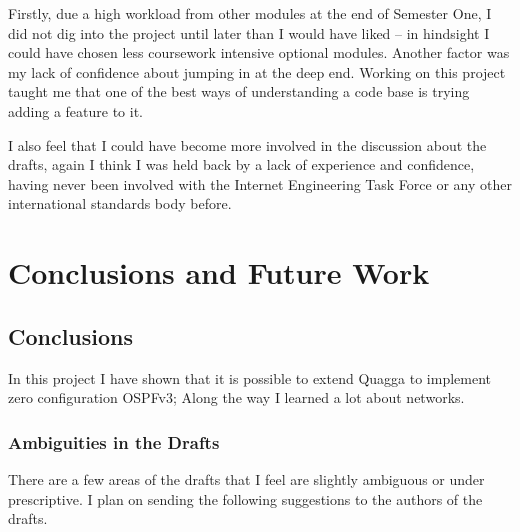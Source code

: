 \documentclass[12pt,a4paper,twoside]{report}
\begin{document}
Firstly, due a high workload from other modules at the end of Semester One, I
did not dig into the project until later than I would have liked -- in
hindsight I could have chosen less coursework intensive optional modules.
Another factor was my lack of confidence about jumping in at the deep end.
Working on this project taught me that one of the best ways of understanding
a code base is trying adding a feature to it.

I also feel that I could have become more involved in the discussion about the
drafts, again I think I was held back by a lack of experience and confidence,
having never been involved with the Internet Engineering Task Force or any
other international standards body before. 


\chapter{Conclusions and Future Work}

\section{Conclusions}
In this project I have shown that it is possible to extend Quagga to implement
zero configuration OSPFv3; Along the way I learned a lot about networks. 

\subsection{Ambiguities in the Drafts}
There are a few areas of the drafts that I feel are slightly ambiguous or under
prescriptive. I plan on sending the following suggestions to the authors of the
drafts.
\end{document}
